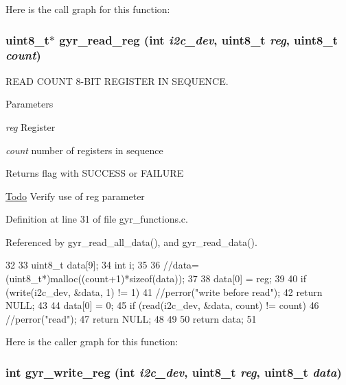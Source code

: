 Here is the call graph for this function:

\hypertarget{group__gyr_gad817a3b69d4c3026b7a9b6de32753e7b}{
\subsubsection[{gyr\_\-read\_\-reg}]{\setlength{\rightskip}{0pt plus 5cm}uint8\_\-t$\ast$ gyr\_\-read\_\-reg (int {\em i2c\_\-dev}, \/  uint8\_\-t {\em reg}, \/  uint8\_\-t {\em count})}}
\label{group__gyr_gad817a3b69d4c3026b7a9b6de32753e7b}


READ COUNT 8-\/BIT REGISTER IN SEQUENCE. 


\begin{DoxyParams}{Parameters}
\item[{\em reg}]Register \item[{\em count}]number of registers in sequence \end{DoxyParams}
\begin{DoxyReturn}{Returns}
flag with SUCCESS or FAILURE 
\end{DoxyReturn}
\begin{Desc}
\item[\hyperlink{todo__todo000002}{Todo}]Verify use of reg parameter \end{Desc}


Definition at line 31 of file gyr\_\-functions.c.



Referenced by gyr\_\-read\_\-all\_\-data(), and gyr\_\-read\_\-data().




\begin{DoxyCode}
32 {
33   uint8_t data[9];
34   int i;
35 
36   //data=(uint8_t*)malloc((count+1)*sizeof(data));
37   
38   data[0] = reg;
39 
40   if (write(i2c_dev, &data, 1) != 1) {           
41         //perror("write before read");
42         return NULL;
43   }
44   data[0] = 0;
45   if (read(i2c_dev, &data, count) != count) {
46         //perror("read");
47         return NULL;    
48   }
49 
50   return data;
51 }
\end{DoxyCode}




Here is the caller graph for this function:

\hypertarget{group__gyr_ga3eba167b8ab0614bfe7bafeae8b5570d}{
\subsubsection[{gyr\_\-write\_\-reg}]{\setlength{\rightskip}{0pt plus 5cm}int gyr\_\-write\_\-reg (int {\em i2c\_\-dev}, \/  uint8\_\-t {\em reg}, \/  uint8\_\-t {\em data})}}
\label{group__gyr_ga3eba167b8ab0614bfe7bafeae8b5570d}


